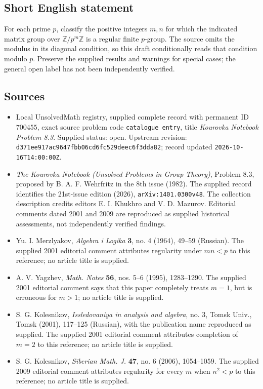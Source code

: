\documentclass[11pt]{article}
\newcommand{\Z}{\mathbb{Z}}
\begin{document}
\subsection{Short English statement}
For each prime \(p\), classify the positive integers \(m,n\) for which the indicated matrix group over \(\Z/p^m\Z\) is a regular finite \(p\)-group. The source omits the modulus in its diagonal condition, so this draft conditionally reads that condition modulo \(p\). Preserve the supplied results and warnings for special cases; the general open label has not been independently verified.
\subsection{Sources}
\begin{itemize}
\item[{[1]}] Local UnsolvedMath registry, supplied complete record with permanent ID \(700455\), exact source problem code \texttt{catalogue entry}, title \emph{Kourovka Notebook Problem 8.3}. Supplied status: open. Upstream revision: \texttt{d371ee917ac9647fbb06cd6fc529deec6f3dda82}; record updated \texttt{2026-10-16T14:00:00Z}.
\item[{[2]}] \emph{The Kourovka Notebook (Unsolved Problems in Group Theory)}, Problem 8.3, proposed by B. A. F. Wehrfritz in the 8th issue (1982). The supplied record identifies the 21st-issue edition (2026), \texttt{arXiv:1401.0300v48}. The collection description credits editors E. I. Khukhro and V. D. Mazurov. Editorial comments dated 2001 and 2009 are reproduced as supplied historical assessments, not independently verified findings.
\item[{[3]}] Yu. I. Merzlyakov, \emph{Algebra i Logika} \textbf{3}, no. 4 (1964), 49--59 (Russian). The supplied 2001 editorial comment attributes regularity under \(mn<p\) to this reference; no article title is supplied.
\item[{[4]}] A. V. Yagzhev, \emph{Math. Notes} \textbf{56}, nos. 5--6 (1995), 1283--1290. The supplied 2001 editorial comment says that this paper completely treats \(m=1\), but is erroneous for \(m>1\); no article title is supplied.
\item[{[5]}] S. G. Kolesnikov, \emph{Issledovaniya in analysis and algebra}, no. 3, Tomsk Univ., Tomsk (2001), 117--125 (Russian), with the publication name reproduced as supplied. The supplied 2001 editorial comment attributes completion of \(m=2\) to this reference; no article title is supplied.
\item[{[6]}] S. G. Kolesnikov, \emph{Siberian Math. J.} \textbf{47}, no. 6 (2006), 1054--1059. The supplied 2009 editorial comment attributes regularity for every \(m\) when \(n^2<p\) to this reference; no article title is supplied.
\end{itemize}
\end{document}
